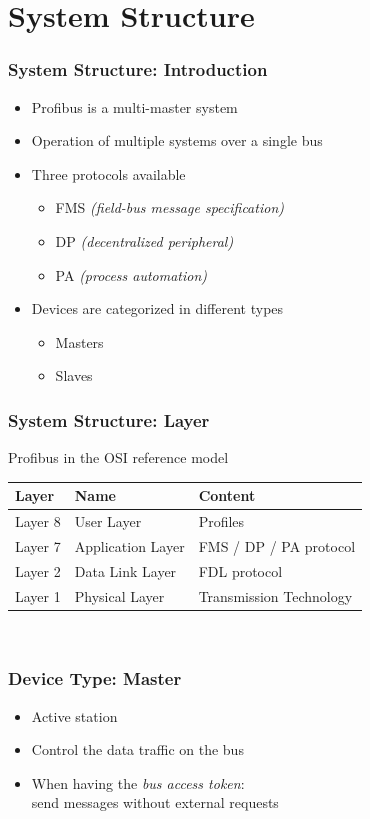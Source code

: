 \documentclass{beamer}
\begin{document}
\section{System Structure}
\begin{frame}
  \frametitle{System Structure: Introduction}
  \begin{itemize}
    \item Profibus is a multi-master system
    \item Operation of multiple systems over a single bus
    \item Three protocols available
      \begin{itemize}
        \item FMS \textit{(field-bus message specification)}
        \item DP \textit{(decentralized peripheral)}
        \item PA \textit{(process automation)}
      \end{itemize}
    \item Devices are categorized in different types
      \begin{itemize}
        \item Masters
        \item Slaves
      \end{itemize}
  \end{itemize}
\end{frame}

\begin{frame}
  \frametitle{System Structure: Layer}
  Profibus in the OSI reference model~\cite{profibusmanual}
  \center
  \footnotesize
  \begin{tabular}[h]{l|l|l}
    \textbf{Layer}  & \textbf{Name}     & \textbf{Content} \\
    \hline
    Layer 8         & User Layer        & Profiles \\
    Layer 7         & Application Layer & FMS / DP / PA protocol \\
    Layer 2         & Data Link Layer   & FDL protocol \\
    Layer 1         & Physical Layer    & Transmission Technology
  \end{tabular} \\
\end{frame}


\begin{frame}
  \frametitle{Device Type: Master}
  \begin{itemize}
    \item Active station
    \item Control the data traffic on the bus
    \item When having the \textit{bus access token}: \\
      send messages without external requests
  \end{itemize}
\end{frame}
\end{document}
